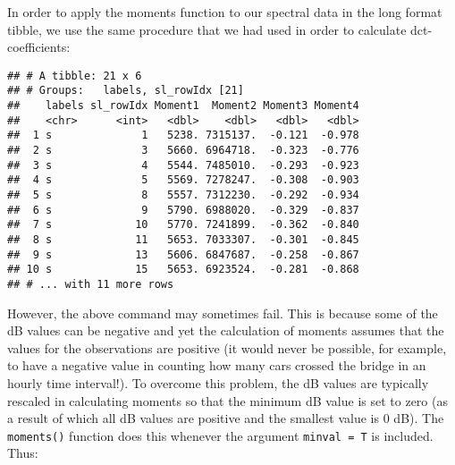 \documentclass[
]{book}
\newenvironment{Shaded}{\begin{snugshade}}{\end{snugshade}}
\newcommand{\AttributeTok}[1]{\textcolor[rgb]{0.77,0.63,0.00}{#1}}
\newcommand{\DecValTok}[1]{\textcolor[rgb]{0.00,0.00,0.81}{#1}}
\newcommand{\FunctionTok}[1]{\textcolor[rgb]{0.00,0.00,0.00}{#1}}
\newcommand{\NormalTok}[1]{#1}
\newcommand{\OtherTok}[1]{\textcolor[rgb]{0.56,0.35,0.01}{#1}}
\newcommand{\SpecialCharTok}[1]{\textcolor[rgb]{0.00,0.00,0.00}{#1}}
\newcommand{\StringTok}[1]{\textcolor[rgb]{0.31,0.60,0.02}{#1}}
\begin{document}
In order to apply the moments function to our spectral data in the long format tibble, we use the same procedure that we had used in order to calculate dct-coefficients:

\begin{Shaded}
\end{Shaded}

\begin{verbatim}
## # A tibble: 21 x 6
## # Groups:   labels, sl_rowIdx [21]
##    labels sl_rowIdx Moment1  Moment2 Moment3 Moment4
##    <chr>      <int>   <dbl>    <dbl>   <dbl>   <dbl>
##  1 s              1   5238. 7315137.  -0.121  -0.978
##  2 s              3   5660. 6964718.  -0.323  -0.776
##  3 s              4   5544. 7485010.  -0.293  -0.923
##  4 s              5   5569. 7278247.  -0.308  -0.903
##  5 s              8   5557. 7312230.  -0.292  -0.934
##  6 s              9   5790. 6988020.  -0.329  -0.837
##  7 s             10   5770. 7241899.  -0.362  -0.840
##  8 s             11   5653. 7033307.  -0.301  -0.845
##  9 s             13   5606. 6847687.  -0.258  -0.867
## 10 s             15   5653. 6923524.  -0.281  -0.868
## # ... with 11 more rows
\end{verbatim}

However, the above command may sometimes fail. This is because some of the dB values can be negative and yet the calculation of moments assumes that the values for the observations are positive (it would never be possible, for example, to have a negative value in counting how many cars crossed the bridge in an hourly time interval!). To overcome this problem, the dB values are typically rescaled in calculating moments so that the minimum dB value is set to zero (as a result of which all dB values are positive and the smallest value is 0 dB). The \texttt{moments()} function does this whenever the argument \texttt{minval\ =\ T} is included. Thus:
\end{document}

